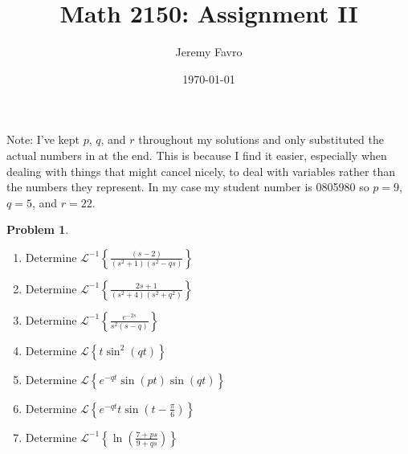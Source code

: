 \documentclass[10pt]{article}
\title{Math 2150: Assignment II}
\author{Jeremy Favro}
\date{\today}
\theoremstyle{definition}
\newtheorem{problem}{Problem}
\newcommand{\laplace}[1]{\mathcal{L}\left\{#1\right\}}
\newcommand{\laplacei}[1]{\mathcal{L}^{-1}\left\{#1\right\}}
\begin{document}
\maketitle
\noindent Note: I've kept $p$, $q$, and $r$ throughout my solutions and only substituted the actual numbers in at the end. This is because I find it easier,
especially when dealing with things that might cancel nicely, to deal with variables rather than the numbers they represent. In my case my
student number is 0805980 so $p=9$, $q=5$, and $r=22$.
\\
\begin{problem}~
\begin{enumerate}[label=(\alph*)]
  \item Determine $\laplacei{\frac{\left(s-2\right)}{\left(s^2+1\right)\left(s^2-qs\right)}}$
  \item Determine $\laplacei{\frac{2s+1}{\left(s^2+4\right)\left(s^2+q^2\right)}}$
  \item Determine $\laplacei{\frac{e^{-2s}}{s^2\left(s-q\right)}}$
  \item Determine $\laplace{t\sin^2\left(qt\right)}$
  \item Determine $\laplace{e^{-qt}\sin\left(pt\right)\sin\left(qt\right)}$
  \item Determine $\laplace{e^{-qt}t\sin\left(t-\frac{\pi}{6}\right)}$
  \item Determine $\laplacei{\ln\left(\frac{7+ps}{9+qs}\right)}$
\end{enumerate}
\end{problem}
\end{document}
